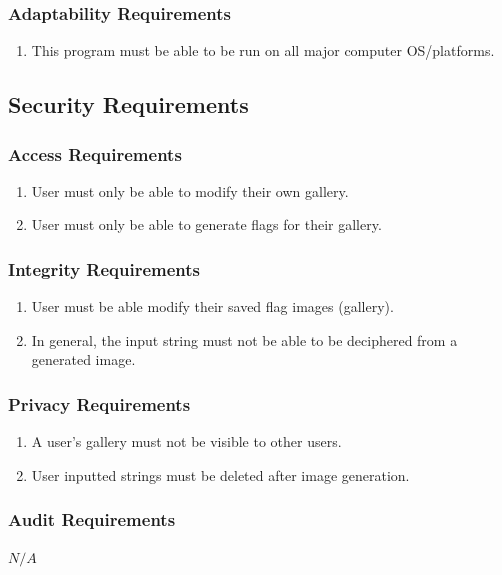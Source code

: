 \documentclass[12pt, titlepage]{article}
\begin{document}
\subsubsection{Adaptability Requirements}
\begin{enumerate}[label=MA\arabic*., resume=mas]
    \item This program must be able to be run on all major computer OS/platforms.
\end{enumerate}
\subsection{Security Requirements} 
\subsubsection{Access Requirements}
\begin{enumerate}[label=SR\arabic*., series=srs]
    \item User must only be able to modify their own gallery.
    \item User must only be able to generate flags for their gallery.
\end{enumerate}
\subsubsection{Integrity Requirements}
\begin{enumerate}[label=SR\arabic*., resume=srs]
    \item User must be able modify their saved flag images (gallery).
    \item In general, the input string must not be able to be deciphered from a generated image.
\end{enumerate}

\subsubsection{Privacy Requirements}
\begin{enumerate}[label=SR\arabic*., resume=srs]
    \item A user's gallery must not be visible to other users.
    \item User inputted strings must be deleted after image generation.
\end{enumerate}
\subsubsection{Audit Requirements}
$N/A$
\end{document}
